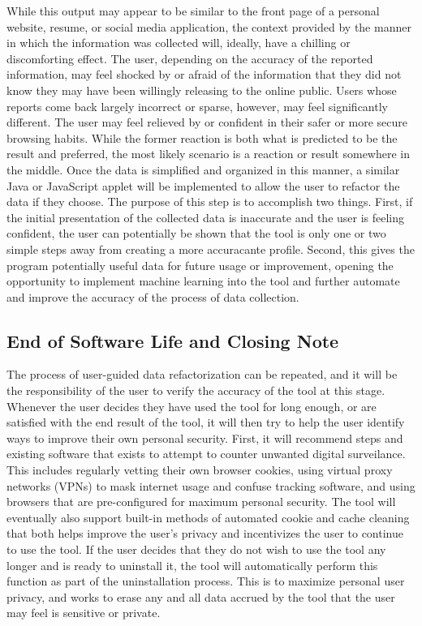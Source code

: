 \documentclass[11pt]{article}
\begin{document}
While this output may appear to be similar to the front page of a personal website, resume, or social media application, the context provided by the manner in which the information was collected will, ideally, have a chilling or discomforting effect. The user, depending on the accuracy of the reported information, may feel shocked by or afraid of the information that they did not know they may have been willingly releasing to the online public. Users whose reports come back largely incorrect or sparse, however, may feel significantly different. The user may feel relieved by or confident in their safer or more secure browsing habits. While the former reaction is both what is predicted to be the result and preferred, the most likely scenario is a reaction or result somewhere in the middle. Once the data is simplified and organized in this manner, a similar Java or JavaScript applet will be implemented to allow the user to refactor the data if they choose. The purpose of this step is to accomplish two things. First, if the initial presentation of the collected data is inaccurate and the user is feeling confident, the user can potentially be shown that the tool is only one or two simple steps away from creating a more accuracante profile. Second, this gives the program potentially useful data for future usage or improvement, opening the opportunity to implement machine learning into the tool and further automate and improve the accuracy of the process of data collection.

\subsection{End of Software Life and Closing Note} \label{sec:end}
The process of user-guided data refactorization can be repeated, and it will be the responsibility of the user to verify the accuracy of the tool at this stage. Whenever the user decides they have used the tool for long enough, or are satisfied with the end result of the tool, it will then try to help the user identify ways to improve their own personal security. First, it will recommend steps and existing software that exists to attempt to counter unwanted digital surveilance. This includes regularly vetting their own browser cookies, using virtual proxy networks (VPNs) to mask internet usage and confuse tracking software, and using browsers that are pre-configured for maximum personal security. The tool will eventually also support built-in methods of automated cookie and cache cleaning that both helps improve the user's privacy and incentivizes the user to continue to use the tool. If the user decides that they do not wish to use the tool any longer and is ready to uninstall it, the tool will automatically perform this function as part of the uninstallation process. This is to maximize personal user privacy, and works to erase any and all data accrued by the tool that the user may feel is sensitive or private. 
\end{document}
